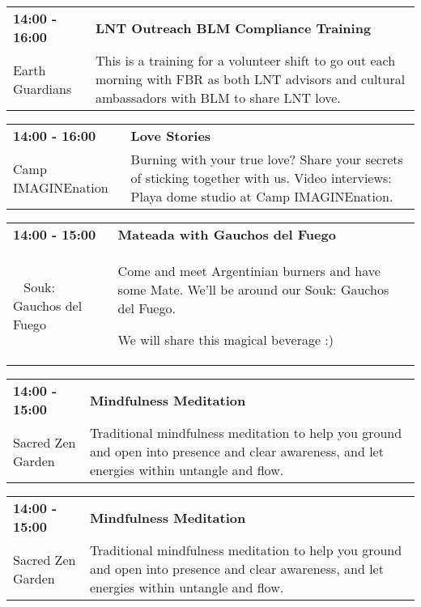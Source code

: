 \begin{tabular}{ p{1in} p{2.2in} }
    \textbf{14:00 - 16:00} & \textbf{LNT Outreach BLM Compliance Training} \\
    Earth Guardians \newline  & This is a training for a volunteer shift to go out each morning with FBR as both LNT advisors and cultural ambassadors with BLM to share LNT love. \\
    \hline 
\end{tabular}
    
\begin{tabular}{ p{1in} p{2.2in} }
    \textbf{14:00 - 16:00} & \textbf{Love Stories} \\
    Camp IMAGINEnation \newline  & Burning with your true love? Share your secrets of sticking together with us. Video interviews: Playa dome studio at Camp IMAGINEnation. \\
    \hline 
\end{tabular}
    
\begin{tabular}{ p{1in} p{2.2in} }
    \textbf{14:00 - 15:00} & \textbf{Mateada with Gauchos del Fuego} \\
    ~ \newline Souk: Gauchos del Fuego & Come and meet Argentinian burners and have some Mate. We'll be around our Souk: Gauchos del Fuego.

We will share this magical beverage :) \\
    \hline 
\end{tabular}
    
\begin{tabular}{ p{1in} p{2.2in} }
    \textbf{14:00 - 15:00} & \textbf{Mindfulness Meditation} \\
    Sacred Zen Garden \newline  & Traditional mindfulness meditation to help you ground and open into presence and clear awareness, and let energies within untangle and flow. \\
    \hline 
\end{tabular}
    
\begin{tabular}{ p{1in} p{2.2in} }
    \textbf{14:00 - 15:00} & \textbf{Mindfulness Meditation} \\
    Sacred Zen Garden \newline  & Traditional mindfulness meditation to help you ground and open into presence and clear awareness, and let energies within untangle and flow. \\
    \hline 
\end{tabular}
    
